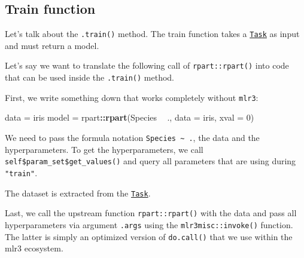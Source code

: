 \documentclass[]{scrbook}
\newenvironment{Shaded}{\begin{snugshade}}{\end{snugshade}}
\newcommand{\ControlFlowTok}[1]{\textcolor[rgb]{0.13,0.29,0.53}{\textbf{#1}}}
\newcommand{\DataTypeTok}[1]{\textcolor[rgb]{0.13,0.29,0.53}{#1}}
\newcommand{\DecValTok}[1]{\textcolor[rgb]{0.00,0.00,0.81}{#1}}
\newcommand{\KeywordTok}[1]{\textcolor[rgb]{0.13,0.29,0.53}{\textbf{#1}}}
\newcommand{\NormalTok}[1]{#1}
\newcommand{\OperatorTok}[1]{\textcolor[rgb]{0.81,0.36,0.00}{\textbf{#1}}}
\newcommand{\StringTok}[1]{\textcolor[rgb]{0.31,0.60,0.02}{#1}}
\renewenvironment{Shaded} {\begin{snugshade}\small} {\end{snugshade}}
\begin{document}
\hypertarget{learner-train}{%
\subsection{Train function}\label{learner-train}}

Let's talk about the \texttt{.train()} method.
The train function takes a \href{https://mlr3.mlr-org.com/reference/Task.html}{\texttt{Task}} as input and must return a model.

Let's say we want to translate the following call of \texttt{rpart::rpart()} into code that can be used inside the \texttt{.train()} method.

First, we write something down that works completely without \texttt{mlr3}:

\begin{Shaded}
\begin{Highlighting}[]
\NormalTok{data =}\StringTok{ }\NormalTok{iris}
\NormalTok{model =}\StringTok{ }\NormalTok{rpart}\OperatorTok{::}\KeywordTok{rpart}\NormalTok{(Species }\OperatorTok{~}\StringTok{ }\NormalTok{., }\DataTypeTok{data =}\NormalTok{ iris, }\DataTypeTok{xval =} \DecValTok{0}\NormalTok{)}
\end{Highlighting}
\end{Shaded}

We need to pass the formula notation \texttt{Species\ \textasciitilde{}\ .}, the data and the hyperparameters.
To get the hyperparameters, we call \texttt{self\$param\_set\$get\_values()} and query all parameters that are using during \texttt{"train"}.

The dataset is extracted from the \href{https://mlr3.mlr-org.com/reference/Task.html}{\texttt{Task}}.

Last, we call the upstream function \texttt{rpart::rpart()} with the data and pass all hyperparameters via argument \texttt{.args} using the \texttt{mlr3misc::invoke()} function.
The latter is simply an optimized version of \texttt{do.call()} that we use within the mlr3 ecosystem.

\begin{Shaded}
\end{Shaded}
\end{document}
